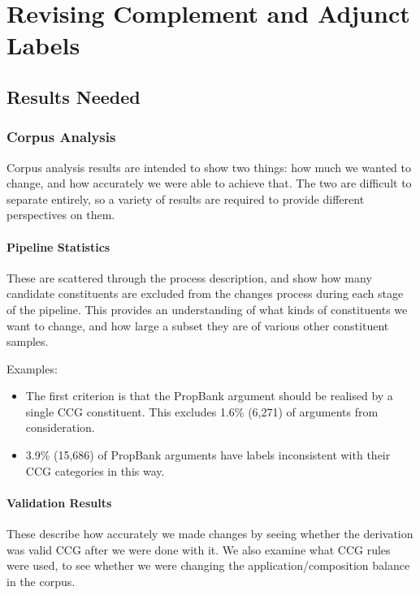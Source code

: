 

\chapter{Revising Complement and Adjunct Labels}

\section{Results Needed}

\subsection{Corpus Analysis}

Corpus analysis results are intended to show two things: how much we wanted to change, and how accurately we were able to achieve that. The two are difficult to separate entirely, so a variety of results are required to provide different perspectives on them.

\subsubsection{Pipeline Statistics}

These are scattered through the process description, and show how many candidate constituents are excluded from the changes process during each stage of the pipeline. This provides an understanding of what kinds of constituents we want to change, and how large a subset they are of various other constituent samples.

Examples:

\begin{itemize}

\item The first criterion is that the PropBank argument should be realised by a single CCG constituent. This excludes 1.6\% (6,271) of arguments from consideration.

\item 3.9\% (15,686) of PropBank arguments have labels inconsistent with their CCG categories in this way.

\end{itemize}

\subsubsection{Validation Results}

These describe how accurately we made changes by seeing whether the derivation was valid CCG after we were done with it. We also examine what CCG rules were used, to see whether we were changing the application/composition balance in the corpus.

